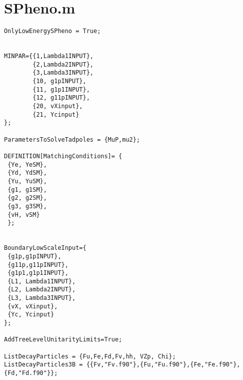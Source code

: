 \section{SPheno.m}
\begin{lstlisting}
OnlyLowEnergySPheno = True;


MINPAR={{1,Lambda1INPUT},
        {2,Lambda2INPUT},
        {3,Lambda3INPUT},
        {10, g1pINPUT},
        {11, g1p1INPUT},
        {12, g11pINPUT},
        {20, vXinput},
        {21, Ycinput}        
};

ParametersToSolveTadpoles = {MuP,mu2};

DEFINITION[MatchingConditions]= {
 {Ye, YeSM},
 {Yd, YdSM},
 {Yu, YuSM},
 {g1, g1SM},
 {g2, g2SM},
 {g3, g3SM},
 {vH, vSM}
 };


BoundaryLowScaleInput={
 {g1p,g1pINPUT},
 {g11p,g11pINPUT},
 {g1p1,g1p1INPUT},
 {L1, Lambda1INPUT},
 {L2, Lambda2INPUT},
 {L3, Lambda3INPUT},
 {vX, vXinput},
 {Yc, Ycinput}
};

AddTreeLevelUnitarityLimits=True;

ListDecayParticles = {Fu,Fe,Fd,Fv,hh, VZp, Chi};
ListDecayParticles3B = {{Fv,"Fv.f90"},{Fu,"Fu.f90"},{Fe,"Fe.f90"},{Fd,"Fd.f90"}};
\end{lstlisting}





